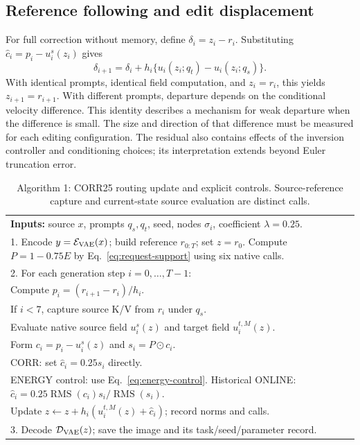 \documentclass[conference]{IEEEtran}
\newcommand{\RMS}{\operatorname{RMS}}
\begin{document}
\subsection{Reference following and edit displacement}
For full correction without memory, define $\delta_i=z_i-r_i$. Substituting $\widehat c_i=p_i-u_i^s(z_i)$ gives
\begin{equation}
\delta_{i+1}=\delta_i+h_i\{u_i(z_i;q_t)-u_i(z_i;q_s)\}.
\label{eq:displacement}
\end{equation}
With identical prompts, identical field computation, and $z_i=r_i$, this yields $z_{i+1}=r_{i+1}$. With different prompts, departure depends on the conditional velocity difference. This identity describes a mechanism for weak departure when the difference is small. The size and direction of that difference must be measured for each editing configuration. The residual also contains effects of the inversion controller and conditioning choices; its interpretation extends beyond Euler truncation error.

\begin{table}[t]
\centering\small
\caption{Algorithm 1: CORR25 routing update and explicit controls. Source-reference capture and current-state source evaluation are distinct calls.}
\label{alg:ours}
\begin{tabular}{p{}}
\toprule
\textbf{Inputs:} source $x$, prompts $q_s,q_t$, seed, nodes $\sigma_i$, coefficient $\lambda=0.25$.\\
1. Encode $y=\mathcal{E}_{\rm VAE}(x)$; build reference $r_{0:T}$; set $z=r_0$. Compute $P=1-0.75E$ by Eq.~\eqref{eq:request-support} using six native calls.\\
2. For each generation step $i=0,\ldots,T-1$:\\
\quad Compute $p_i=(r_{i+1}-r_i)/h_i$.\\
\quad If $i<7$, capture source K/V from $r_i$ under $q_s$.\\
\quad Evaluate native source field $u_i^s(z)$ and target field $u_i^{t,M}(z)$.\\
\quad Form $c_i=p_i-u_i^s(z)$ and $s_i=P\odot c_i$.\\
\quad CORR: set $\widehat c_i=0.25s_i$ directly.\\
\quad ENERGY control: use Eq.~\eqref{eq:energy-control}. Historical ONLINE: $\widehat c_i=0.25\RMS(c_i)s_i/\RMS(s_i)$.\\
\quad Update $z\leftarrow z+h_i(u_i^{t,M}(z)+\widehat c_i)$; record norms and calls.\\
3. Decode $\mathcal{D}_{\rm VAE}(z)$; save the image and its task/seed/parameter record.\\
\bottomrule
\end{tabular}
\end{table}
\end{document}
